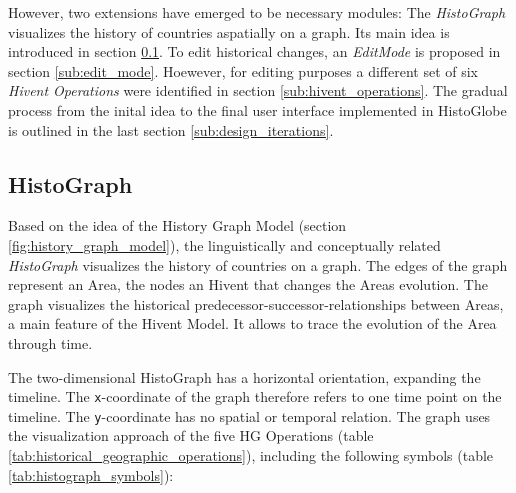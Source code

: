 However, two extensions have emerged to be necessary modules: The \emph{HistoGraph} visualizes the history of countries aspatially on a graph. Its main idea is introduced in section \ref{sub:histograph}. To edit historical changes, an \emph{EditMode} is proposed in section \ref{sub:edit_mode}. Hoewever, for editing purposes a different set of six \emph{Hivent Operations} were identified in section \ref{sub:hivent_operations}. The gradual process from the inital idea to the final user interface implemented in HistoGlobe is outlined in the last section \ref{sub:design_iterations}.

\subsection{HistoGraph} %
\label{sub:histograph}

Based on the idea of the History Graph Model (section \ref{fig:history_graph_model}), the linguistically and conceptually related \emph{HistoGraph} visualizes the history of countries on a graph. The edges of the graph represent an Area, the nodes an Hivent that changes the Areas evolution. The graph visualizes the historical predecessor-successor-relationships between Areas, a main feature of the Hivent Model. It allows to trace the evolution of the Area through time.

The two-dimensional HistoGraph has a horizontal orientation, expanding the timeline. The \texttt{x}-coordinate of the graph therefore refers to one time point on the timeline. The \texttt{y}-coordinate has no spatial or temporal relation. The graph uses the visualization approach of the five HG Operations (table \ref{tab:historical_geographic_operations}), including the following symbols (table \ref{tab:histograph_symbols}):

